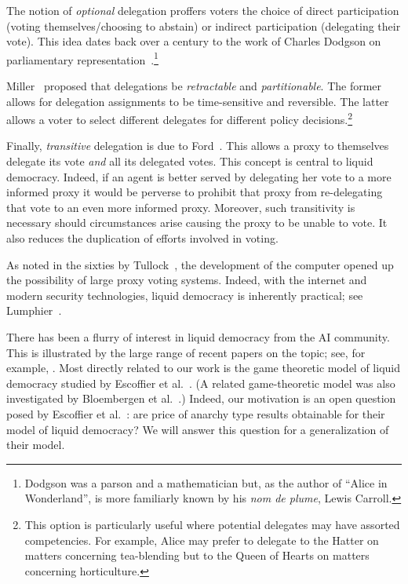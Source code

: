 The notion of {\em optional} delegation proffers voters the choice of direct participation (voting themselves/choosing to abstain)
or indirect participation (delegating their vote). This idea dates back over a century to the work of Charles Dodgson on parliamentary 
representation~\cite{Dod1884}.\footnote{Dodgson was a parson and 
a mathematician but, as the author of  ``Alice in Wonderland'', is more familiarly known by his {\em nom de plume}, Lewis Carroll.}

Miller~\cite{Mil69} proposed that delegations be {\em retractable} and {\em partitionable}.
The former allows for delegation assignments to be time-sensitive and reversible.
The latter allows a voter to select different delegates for different policy decisions.\footnote{This option is particularly useful 
where potential delegates may have assorted competencies. For example, Alice may prefer to delegate to the Hatter on
matters concerning tea-blending but to the Queen of Hearts on matters concerning horticulture.}
 
Finally, {\em transitive} delegation is due to Ford~\cite{For02}. This allows a proxy to themselves delegate its vote {\em and} 
all its delegated votes. This concept is central to liquid democracy. Indeed, if an agent is better served by delegating her vote to 
a more informed proxy it would be perverse to prohibit that proxy from re-delegating that vote to an even more informed proxy.  
Moreover, such transitivity is necessary should circumstances arise causing the proxy to be unable to vote. It also reduces the 
duplication of efforts involved in voting.

As noted in the sixties by Tullock~\cite{Tol67}, the development of the computer opened up the possibility of large proxy voting systems.
Indeed, with the internet and modern security technologies, liquid democracy is inherently practical; see Lumphier~\cite{Lan95}.

There has been a flurry of interest in liquid democracy from the AI community. This is illustrated by the large range of 
recent papers on the topic; see, for example, \cite{Bri18,  BT18, CG17, CMM17, GKM18, 
GA15, KMP18, KR20, ZZ17}. Most directly related to our work is the game theoretic model of liquid democracy 
studied by Escoffier et al.~\cite{EGP19}. (A related game-theoretic model was also investigated by Bloembergen et al.~\cite{BGL19}.) Indeed, our motivation is an open question posed by Escoffier et al.~\cite{EGP19}:
are price of anarchy type results obtainable for their model of liquid democracy?
We will answer this question for a generalization of their model. 

